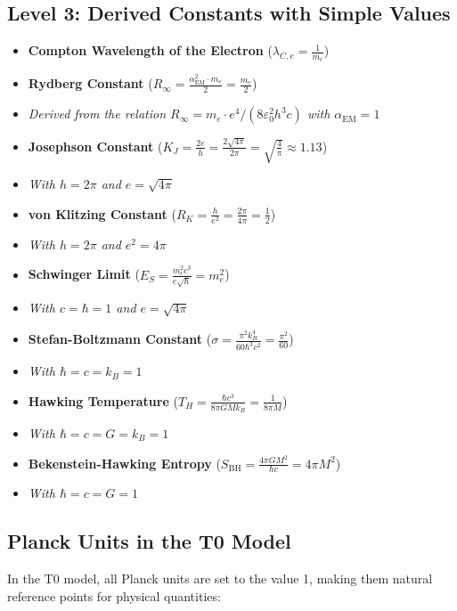 \documentclass[12pt,a4paper]{article}
\newcommand{\alphaEM}{\alpha_{\text{EM}}}
\begin{document}
	\subsection*{Level 3: Derived Constants with Simple Values}
	\begin{itemize}[itemsep=0.5em]
		\item \textbf{Compton Wavelength of the Electron} (\(\lambda_{C,e} = \frac{1}{m_e}\))
		\item \textbf{Rydberg Constant} (\(R_\infty = \frac{\alphaEM^2 \cdot m_e}{2} = \frac{m_e}{2}\))
		\item[] \textit{Derived from the relation $R_\infty = m_e\cdot e^4/(8\varepsilon_0^2h^3c)$ with $\alphaEM = 1$}
		\item \textbf{Josephson Constant} (\(K_J = \frac{2e}{h} = \frac{2\sqrt{4\pi}}{2\pi} = \sqrt{\frac{4}{\pi}} \approx 1.13\))
		\item[] \textit{With $h = 2\pi$ and $e = \sqrt{4\pi}$}
		\item \textbf{von Klitzing Constant} (\(R_K = \frac{h}{e^2} = \frac{2\pi}{4\pi} = \frac{1}{2}\))
		\item[] \textit{With $h = 2\pi$ and $e^2 = 4\pi$}
		\item \textbf{Schwinger Limit} (\(E_S = \frac{m_e^2c^3}{e\sqrt{\hbar}} = m_e^2\))
		\item[] \textit{With $c = \hbar = 1$ and $e = \sqrt{4\pi}$}
		\item \textbf{Stefan-Boltzmann Constant} (\(\sigma = \frac{\pi^2k_B^4}{60\hbar^3c^2} = \frac{\pi^2}{60}\))
		\item[] \textit{With $\hbar = c = k_B = 1$}
		\item \textbf{Hawking Temperature} (\(T_H = \frac{\hbar c^3}{8\pi GMk_B} = \frac{1}{8\pi M}\))
		\item[] \textit{With $\hbar = c = G = k_B = 1$}
		\item \textbf{Bekenstein-Hawking Entropy} (\(S_{\mathrm{BH}} = \frac{4\pi GM^2}{\hbar c} = 4\pi M^2\))
		\item[] \textit{With $\hbar = c = G = 1$}
	\end{itemize}
	
	\subsection*{Planck Units in the T0 Model}
	
	In the T0 model, all Planck units are set to the value 1, making them natural reference points for physical quantities:
	
\end{document}
